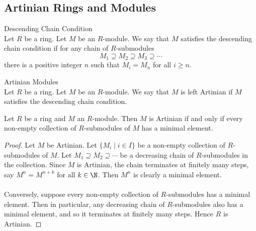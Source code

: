 \documentclass[a4paper]{article}
\begin{document}
\subsection{Artinian Rings and Modules}
\begin{defn}{Descending Chain Condition}{}\\
Let $R$ be a ring. Let $M$ be an $R$-module. We say that $M$ satisfies the descending chain condition if for any chain of $R$-submodules $$M_1\supseteq M_2\supseteq M_3\supseteq\cdots$$ there is a positive integer $n$ such that $M_i=M_n$ for all $i\geq n$. 
\end{defn}

\begin{defn}{Artinian Modules}{}\\
Let $R$ be a ring. Let $M$ be an $R$-module. We say that $M$ is left Artinian if $M$ satisfies the descending chain condition. 
\end{defn}

\begin{prp}{}{} Let $R$ be a ring and $M$ an $R$-module. Then $M$ is Artinian if and only if every non-empty collection of $R$-submodules of $M$ has a minimal element. 
\begin{proof}
Let $M$ be Artinian. Let $\{M_i\;|\;i\in I\}$ be a non-empty collection of $R$-submodules of $M$. Let $M_1\supseteq M_2\supseteq\cdots$ be a decreasing chain of $R$-submodules in the collection. Since $M$ is Artinian, the chain terminates at finitely many steps, say $M^n=M^{n+k}$ for all $k\in\N$. Then $M^n$ is clearly a minimal element. \\~\\

Conversely, suppose every non-empty collection of $R$-submodules has a minimal element. Then in particular, any decreasing chain of $R$-submodules also has a minimal element, and so it terminates at finitely many steps. Hence $R$ is Artinian. 
\end{proof}
\end{prp}
\end{document}

